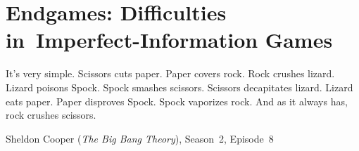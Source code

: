 \chapter{Endgames: Difficulties in~Imperfect-Information Games}
{
  \setlength{\epigraphwidth}{0.75\textwidth}
  \epigraph{
    It's very simple.
    Scissors cuts paper.
    Paper covers rock.
    Rock crushes lizard.
    Lizard poisons Spock.
    Spock smashes scissors.
    Scissors decapitates lizard.
    Lizard eats paper.
    Paper disproves Spock.
    Spock vaporizes rock.
    And as it always has, rock crushes scissors.
  }{Sheldon Cooper (\emph{The Big Bang Theory}), Season~2, Episode~8}
}
